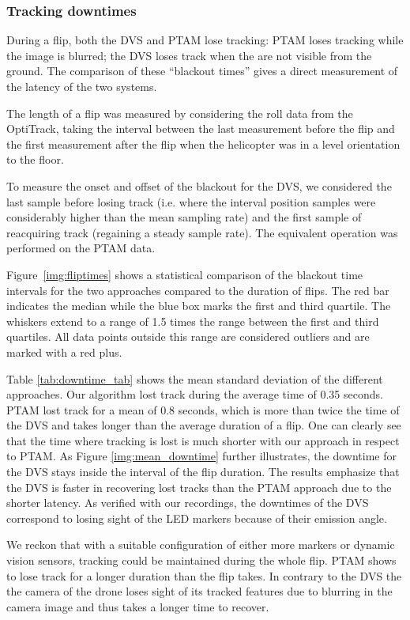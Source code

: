 \subsubsection{Tracking downtimes\label{sec:trackingspeed}}

During a flip, both the DVS and PTAM lose tracking: PTAM loses tracking
while the image is blurred; the DVS loses track when the \ALMs are
not visible from the ground. The comparison of these ``blackout times''
gives a direct measurement of the latency of the two systems. 



The length of a flip was measured by considering the roll data from
the OptiTrack, taking the interval between the last measurement before
the flip and the first measurement after the flip when the helicopter
was in a level orientation to the floor. 

To measure the onset and offset of the blackout for the DVS, we considered
the last sample before losing track (i.e. where the interval position
samples were considerably higher than the mean sampling rate) and
the first sample of reacquiring track (regaining a steady sample rate).
The equivalent operation was performed on the PTAM data. 

Figure~\ref{img:fliptimes} shows a statistical comparison of the
blackout time intervals for the two approaches compared to the duration
of flips. The red bar indicates the median while the blue box marks
the first and third quartile. The whiskers extend to a range of 1.5
times the range between the first and third quartiles. All data points
outside this range are considered outliers and are marked with a red
plus.

Table \ref{tab:downtime_tab} shows the mean standard deviation of
the different approaches. Our algorithm lost track during the average
time of 0.35 seconds. PTAM lost track for a mean of 0.8 seconds, which
is more than twice the time of the DVS and takes longer than the average
duration of a flip. One can clearly see that the time where tracking
is lost is much shorter with our approach in respect to PTAM. As Figure
\ref{img:mean_downtime} further illustrates, the downtime for the
DVS stays inside the interval of the flip duration. The results emphasize
that the DVS is faster in recovering lost tracks than the PTAM approach
due to the shorter latency. As verified with our recordings, the downtimes
of the DVS correspond to losing sight of the LED markers because of
their emission angle. 

We reckon that with a suitable configuration of either more markers
or dynamic vision sensors, tracking could be maintained during the
whole flip. PTAM shows to lose track for a longer duration than the
flip takes. In contrary to the DVS the the camera of the drone loses
sight of its tracked features due to blurring in the camera image
and thus takes a longer time to recover.

